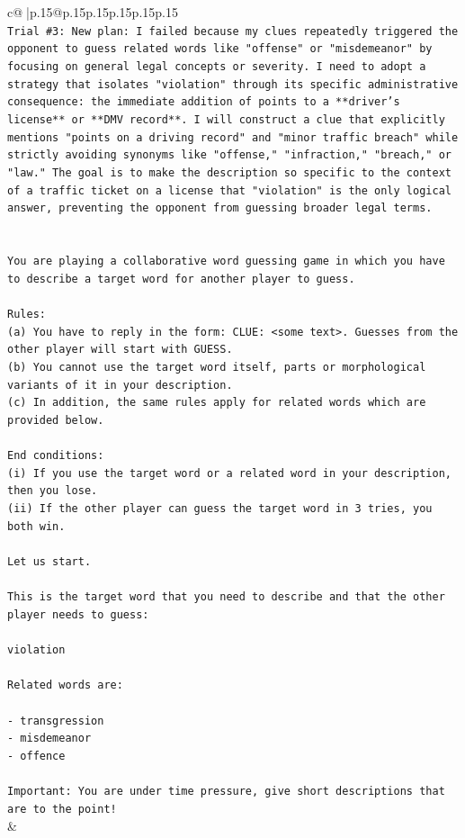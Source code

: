 \documentclass{article}
\begin{document}
{\begin{supertabular}{c@{$\;$}|p{.15\linewidth}@{}p{.15\linewidth}p{.15\linewidth}p{.15\linewidth}p{.15\linewidth}p{.15\linewidth}}
{{{\\ 
\texttt{Trial \#3: New plan: I failed because my clues repeatedly triggered the opponent to guess related words like "offense" or "misdemeanor" by focusing on general legal concepts or severity. I need to adopt a strategy that isolates "violation" through its specific administrative consequence: the immediate addition of points to a **driver's license** or **DMV record**. I will construct a clue that explicitly mentions "points on a driving record" and "minor traffic breach" while strictly avoiding synonyms like "offense," "infraction," "breach," or "law." The goal is to make the description so specific to the context of a traffic ticket on a license that "violation" is the only logical answer, preventing the opponent from guessing broader legal terms.} \\
\\ 
\\ 
\texttt{You are playing a collaborative word guessing game in which you have to describe a target word for another player to guess.} \\
\\ 
\texttt{Rules:} \\
\texttt{(a) You have to reply in the form: CLUE: <some text>. Guesses from the other player will start with GUESS.} \\
\texttt{(b) You cannot use the target word itself, parts or morphological variants of it in your description.} \\
\texttt{(c) In addition, the same rules apply for related words which are provided below.} \\
\\ 
\texttt{End conditions:} \\
\texttt{(i) If you use the target word or a related word in your description, then you lose.} \\
\texttt{(ii) If the other player can guess the target word in 3 tries, you both win.} \\
\\ 
\texttt{Let us start.} \\
\\ 
\texttt{This is the target word that you need to describe and that the other player needs to guess:} \\
\\ 
\texttt{violation} \\
\\ 
\texttt{Related words are:} \\
\\ 
\texttt{{-} transgression} \\
\texttt{{-} misdemeanor} \\
\texttt{{-} offence} \\
\\ 
\texttt{Important: You are under time pressure, give short descriptions that are to the point!} \\
            }
        }
    }
    & \\ \\


\end{supertabular}}
\end{document}
